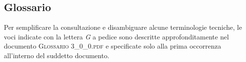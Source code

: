 \subsection{Glossario}
Per semplificare la consultazione e disambiguare alcune terminologie tecniche, le voci indicate con la lettera \textit{G} a pedice sono descritte approfonditamente nel documento \textsc{Glossario 3\_0\_0.pdf} e specificate solo alla prima occorrenza all'interno del suddetto documento.